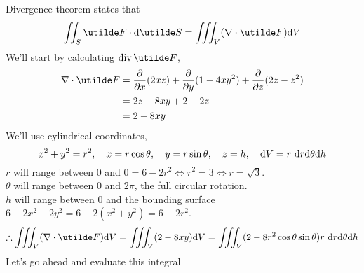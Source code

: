 \documentclass[a4paper,12pt]{report}
\begin{document}
\newpage
{}
\sol
Divergence theorem states that
$$
  \iint_S \ut{F}\cd\d\ut{S} = \iiint_V (\grad\cd\ut{F})\d V
$$
We'll start by calculating $\Div\ut{F}$,
\begin{align*}
  \grad\cd\ut{F} &= \del{}{x}(2xz) + \del{}{y}(1-4xy^2) + \del{}{z}(2z-z^2) \\
    &= 2z - 8xy + 2 - 2z \\
    &= 2 - 8xy
\end{align*}
We'll use cylindrical coordinates,
$$
  x^2 + y^2 = r^2,\quad x = r\cos\theta,\quad y = r\sin\theta,\quad z = h,\quad \mathrm{d} V = r\ \mathrm{d} r\mathrm{d}\theta\mathrm{d} h
$$
$r$ will range between $0$ and $0=6-2r^2\iff r^2 = 3 \iff r = \sqrt{3}$. \\
$\theta$ will range between $0$ and $2\pi$, the full circular rotation. \\
$h$ will range between $0$ and the bounding surface $6 - 2x^2 - 2y^2 = 6 - 2(x^2+y^2) = 6 - 2r^2$.
$$
  \tf \iiint_V (\grad\cd\ut{F})\d V = \iiint_V (2 - 8xy)\d V = \iiint_V (2 - 8r^2\cos\theta\sin\theta)r\ \d r\d\theta\d h
$$
Let's go ahead and evaluate this integral
\end{document}
